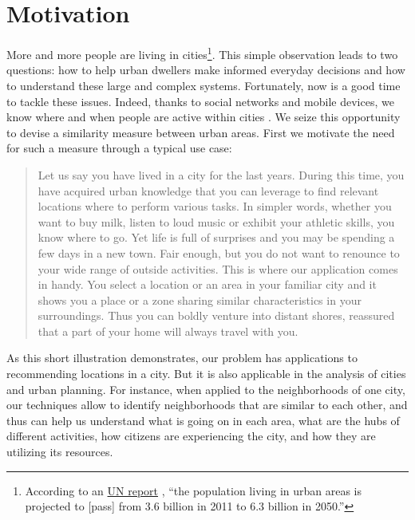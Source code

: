 \section{Motivation}
\label{sec:motivation}

More and more people are living in cities\footnote{According to an
\href{http://esa.un.org/unup/pdf/WUP2011_Highlights.pdf}{UN report}
\autocite{UNreport12}, \enquote{the population living in urban areas is
projected to [pass] from 3.6 billion in 2011 to 6.3 billion in 2050.}}. This
simple observation leads to two questions: how to help urban dwellers make
informed everyday decisions and how to understand these large and complex
systems. Fortunately, now is a good time to tackle these issues. Indeed, thanks
to social networks and mobile devices, we know where and when people are
active within cities \autocite{SpatialComputing12}. We seize this opportunity
to devise a similarity measure between urban areas. First we motivate the
need for such a measure through a typical use case:

\begin{quote}
Let us say you have lived in a city for the last years. During this time,
you have acquired urban knowledge that you can leverage to find relevant
locations where to perform various tasks. In simpler words, whether you want
to buy milk, listen to loud music or exhibit your athletic skills, you know
where to go. Yet life is full of surprises and you may be spending a few
days in a new town. Fair enough, but you do not want to renounce to your
wide range of outside activities. This is where our application comes in
handy. You select a location or an area in your familiar city and it shows
you a place or a zone sharing similar characteristics in your surroundings.
Thus you can boldly venture into distant shores, reassured that a part of
your home will always travel with you.
\end{quote}


As this short illustration demonstrates, our problem has applications to
recommending locations in a city.
But it is also applicable in the analysis of cities and urban planning. For
instance, when applied to the neighborhoods of one city, our techniques allow
to identify neighborhoods that are similar to each other, and thus can help us
understand what is going on in each area, what are the hubs of different
activities, how citizens are experiencing the city, and how they are utilizing
its resources. 
